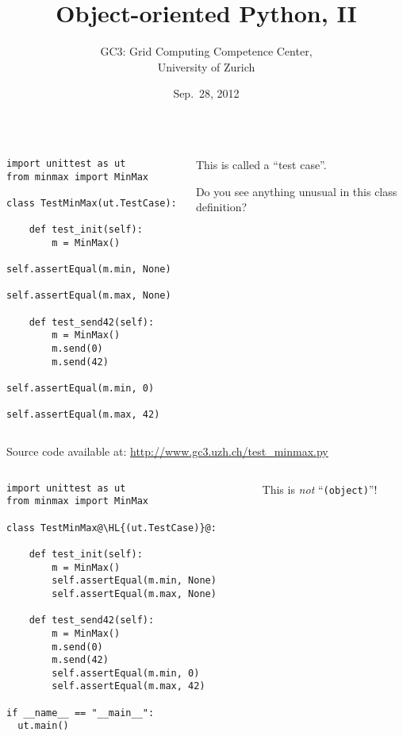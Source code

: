 \documentclass[english,serif,mathserif,xcolor=pdftex,dvipsnames,table]{beamer}
\title[OOP2]{%
  Object-oriented Python, II
}
\author[GC3]{%
  GC3: Grid Computing Competence Center, \\
  University of Zurich
}
\date{Sep.~28, 2012}
\begin{document}
\maketitle


\begin{frame}[fragile]
  \begin{columns}[t]
    \begin{column}{0.5\textwidth}
\begin{lstlisting}
import unittest as ut
from minmax import MinMax

class TestMinMax(ut.TestCase):

    def test_init(self):
        m = MinMax()
        self.assertEqual(m.min, None)
        self.assertEqual(m.max, None)

    def test_send42(self):
        m = MinMax()
        m.send(0)
        m.send(42)
        self.assertEqual(m.min, 0)
        self.assertEqual(m.max, 42)
\end{lstlisting}
    \end{column}
    \begin{column}{0.5\textwidth}
      \raggedleft 
      This is called a ``test case''.

      \+ 
      Do you see anything unusual in this class definition?
    \end{column}
  \end{columns}
  
  {\small Source code available at:
    \url{http://www.gc3.uzh.ch/test_minmax.py}}
\end{frame}


\begin{frame}[fragile]
  \begin{columns}[t]
    \begin{column}{0.5\textwidth}
\begin{lstlisting}
import unittest as ut
from minmax import MinMax

class TestMinMax@\HL{(ut.TestCase)}@:

    def test_init(self):
        m = MinMax()
        self.assertEqual(m.min, None)
        self.assertEqual(m.max, None)

    def test_send42(self):
        m = MinMax()
        m.send(0)
        m.send(42)
        self.assertEqual(m.min, 0)
        self.assertEqual(m.max, 42)

if __name__ == "__main__":
  ut.main()
\end{lstlisting}
    \end{column}
    \begin{column}{0.5\textwidth}
      \raggedleft 
      This is \emph{not} ``\texttt{(object)}''!
    \end{column}
  \end{columns}
\end{frame}
\end{document}
